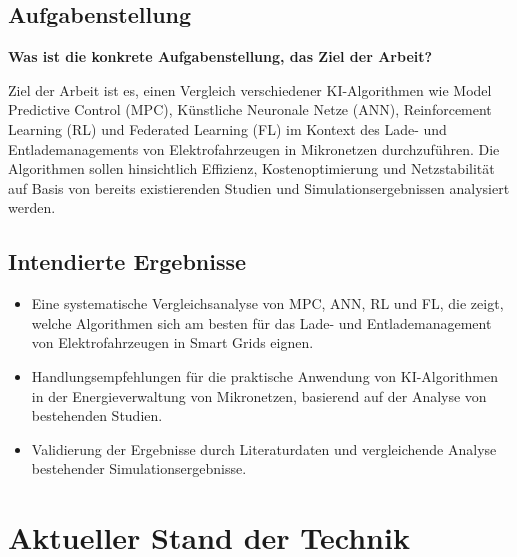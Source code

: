 \documentclass[12pt]{article} %
\begin{document}
\subsection{Aufgabenstellung}

\textbf{Was ist die konkrete Aufgabenstellung, das Ziel der Arbeit?}

Ziel der Arbeit ist es, einen Vergleich verschiedener KI-Algorithmen wie Model Predictive Control (MPC), Künstliche Neuronale Netze (ANN), Reinforcement Learning (RL) und Federated Learning (FL) im Kontext des Lade- und Entlademanagements von Elektrofahrzeugen in Mikronetzen durchzuführen. Die Algorithmen sollen hinsichtlich Effizienz, Kostenoptimierung und Netzstabilität auf Basis von bereits existierenden Studien und Simulationsergebnissen analysiert werden.


\subsection{Intendierte Ergebnisse}
\begin{itemize}
    \item Eine systematische Vergleichsanalyse von MPC, ANN, RL und FL, die zeigt, welche Algorithmen sich am besten für das Lade- und Entlademanagement von Elektrofahrzeugen in Smart Grids eignen.
    \item Handlungsempfehlungen für die praktische Anwendung von KI-Algorithmen in der Energieverwaltung von Mikronetzen, basierend auf der Analyse von bestehenden Studien.
    \item Validierung der Ergebnisse durch Literaturdaten und vergleichende Analyse bestehender Simulationsergebnisse.
\end{itemize}


\section{Aktueller Stand der Technik}
\end{document}
